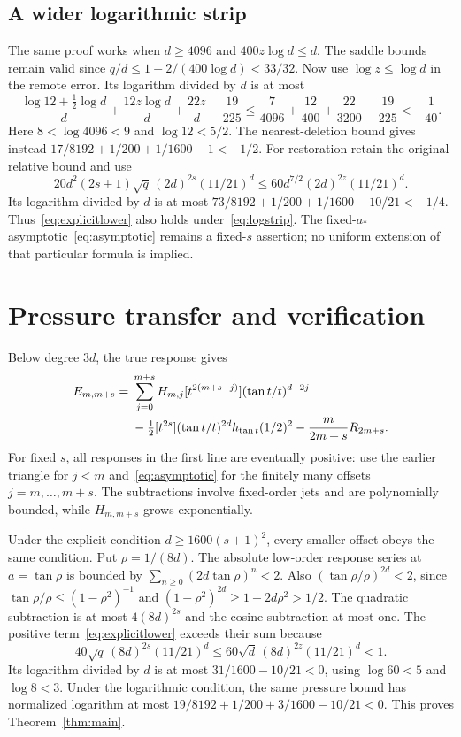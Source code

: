 \documentclass[11pt,a4paper]{article}
\theoremstyle{remark}\newtheorem*{ednote}{Editorial note (ProveIt, 2026-10-01)}
\begin{document}
\subsection{A wider logarithmic strip}
The same proof works when $d\ge4096$ and $400z\log d\le d$. The saddle bounds remain valid since $q/d\le1+2/(400\log d)<33/32$. Now use $\log z\le\log d$ in the remote error. Its logarithm divided by $d$ is at most
\[
\frac{\log12+\tfrac12\log d}{d}+\frac{12z\log d}{d}+\frac{22z}{d}-\frac{19}{225}
\le\frac7{4096}+\frac{12}{400}+\frac{22}{3200}-\frac{19}{225}<-\frac1{40}.
\]
Here $8<\log4096<9$ and $\log12<5/2$. The nearest-deletion bound gives instead $17/8192+1/200+1/1600-1<-1/2$. For restoration retain the original relative bound and use
\[
20d^2(2s+1)\sqrt q\,(2d)^{2s}(11/21)^d
\le60d^{7/2}(2d)^{2z}(11/21)^d.
\]
Its logarithm divided by $d$ is at most $73/8192+1/200+1/1600-10/21<-1/4$. Thus~\eqref{eq:explicitlower} also holds under~\eqref{eq:logstrip}. The fixed-$a_*$ asymptotic~\eqref{eq:asymptotic} remains a fixed-$s$ assertion; no uniform extension of that particular formula is implied.


\section{Pressure transfer and verification}
Below degree $3d$, the true response gives
\begin{align}\label{eq:pressure}
E_{m,m+s}={}&\sum_{j=0}^{m+s}H_{m,j}
[t^{2(m+s-j)}](\tan t/t)^{d+2j}\notag\\
&-\tfrac12[t^{2s}](\tan t/t)^{2d}h_{\tan t}(1/2)^2
-\frac{m}{2m+s}R_{2m+s}.
\end{align}
For fixed $s$, all responses in the first line are eventually positive: use the earlier triangle for $j<m$ and~\eqref{eq:asymptotic} for the finitely many offsets $j=m,\ldots,m+s$. The subtractions involve fixed-order jets and are polynomially bounded, while $H_{m,m+s}$ grows exponentially.

Under the explicit condition $d\ge1600(s+1)^2$, every smaller offset obeys the same condition. Put $\rho=1/(8d)$. The absolute low-order response series at $a=\tan\rho$ is bounded by $\sum_{n\ge0}(2d\tan\rho)^n<2$. Also $(\tan\rho/\rho)^{2d}<2$, since $\tan\rho/\rho\le(1-\rho^2)^{-1}$ and $(1-\rho^2)^{2d}\ge1-2d\rho^2>1/2$. The quadratic subtraction is at most $4(8d)^{2s}$ and the cosine subtraction at most one. The positive term~\eqref{eq:explicitlower} exceeds their sum because
\[
40\sqrt q\,(8d)^{2s}(11/21)^d
\le60\sqrt d\,(8d)^{2z}(11/21)^d<1.
\]
Its logarithm divided by $d$ is at most $31/1600-10/21<0$, using $\log60<5$ and $\log8<3$. Under the logarithmic condition, the same pressure bound has normalized logarithm at most $19/8192+1/200+3/1600-10/21<0$. This proves Theorem~\ref{thm:main}.
\end{document}
